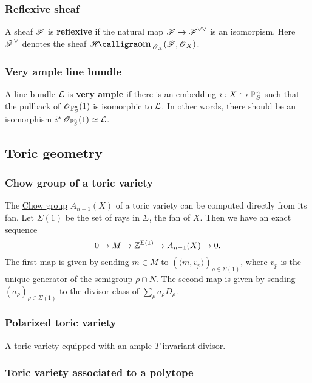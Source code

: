 \documentclass[11pt, english]{article}
\begin{document}
\subsubsection{Reflexive sheaf}
\label{reflexivesheaf}

A sheaf $\operatorname{\mathscr{F}}$ is \textbf{reflexive} if the natural map $\operatorname{\mathscr{F}} \to \operatorname{\mathscr{F}}^{\vee\vee}$ is an isomorpism. Here $\operatorname{\mathscr{F}}^\vee$ denotes the sheaf $\Shom_{\OO_X}(\FF,\OO_X)$.

\subsubsection{Very ample line bundle}
\label{veryample}
A line bundle $\mathcal{L}$ is \textbf{very ample} if there is an embedding $i:X \hookrightarrow \mathbb{P}_S^n$ such that the pullback of $\operatorname{\mathscr{O}}_{\mathbb{P}_S^n}(1)$ is isomorphic to $\mathcal{L}$. In other words, there should be an isomorphism $i^\ast \operatorname{\mathscr{O}}_{\mathbb{P}^n_S}(1) \simeq \mathcal{L}$.

\subsection{Toric geometry}

\subsubsection{Chow group of a toric variety}
\label{chowtoric}

The \hyperref[chowgroup]{Chow group} $A_{n-1}(X)$ of a toric variety can be computed directly from its fan. Let $\Sigma(1)$ be the set of rays in $\Sigma$, the fan of $X$. Then we have an exact sequence
\[
 0 \to M \to \mathbb{Z}^{\Sigma(1)} \to A_{n-1}(X) \to 0.
\] 
The first map is given by sending $m \in M$ to $(\langle m,v_p \rangle )_{\rho \in \Sigma(1)}$, where $v_p$ is the unique generator of the semigroup $\rho \cap N$. The second map is given by sending $(a_\rho)_{\rho \in \Sigma(1)}$ to the divisor class of $\sum_\rho  a_\rho D_\rho$. 

\subsubsection{Polarized toric variety}
A toric variety equipped with an \hyperref[amplelinebundle]{ample} $T$-invariant divisor.

\subsubsection{Toric variety associated to a polytope}
\end{document}

